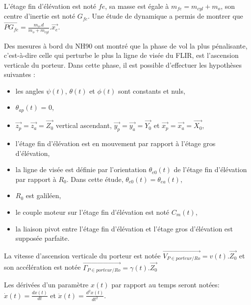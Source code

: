 L'étage fin d'élévation est noté $fe$, sa masse est égale à $m_{fe}=m_{cyl}+m_o$, son centre d'inertie est noté $G_{fe}$. Une étude de dynamique a permis de montrer que $\overrightarrow{PG_{fe}}=\frac{m_o.d}{m_o+m_{cyl}}.\overrightarrow{x_e}$.

Des mesures à bord du NH90 ont montré que la phase de vol la plus pénalisante, c'est-à-dire celle qui perturbe le plus la ligne de visée du FLIR, est l'ascension verticale du porteur. Dans cette phase, il est possible d'effectuer les hypothèses suivantes :
\begin{itemize}
 \item les angles $\psi(t)$, $\theta(t)$ et $\phi(t)$ sont constants et nuls,
 \item $\theta_{ap}(t)$ = 0,
 \item $\overrightarrow{z_p}=\overrightarrow{z_a}=\overrightarrow{Z_0}$ vertical ascendant, $\overrightarrow{y_p}=\overrightarrow{y_a}=\overrightarrow{Y_0}$ et $\overrightarrow{x_p}=\overrightarrow{x_a}=\overrightarrow{X_0}$,
 \item l'étage fin d'élévation est en mouvement par rapport à l'étage gros d'élévation,
 \item la ligne de visée est définie par l'orientation $\theta_{e0}(t)$ de l'étage fin d'élévation par rapport à $R_0$. Dans cette étude, $\theta_{e0}(t)=\theta_{ea}(t)$,
 \item $R_0$ est galiléen,
 \item le couple moteur sur l'étage fin d'élévation est noté $C_m(t)$,
 \item la liaison pivot entre l'étage fin d'élévation et l'étage gros d'élévation est supposée parfaite.
\end{itemize}

La vitesse d'ascension verticale du porteur est notée $\overrightarrow{V_{P\in porteur/Ro}}=v(t).\overrightarrow{Z_0}$ et son accélération est notée $\overrightarrow{\Gamma_{P\in porteur/Ro}}=\gamma(t).\overrightarrow{Z_0}$

Les dérivées d'un paramètre $x(t)$ par rapport au temps seront notées: $\dot{x}(t)=\frac{dx(t)}{dt}$ et $\ddot{x}(t)=\frac{d^2x(t)}{dt^2}$.



